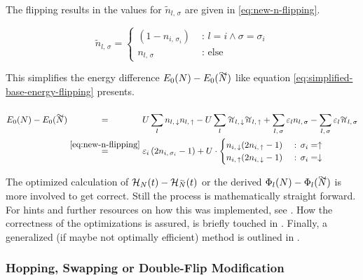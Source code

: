 The flipping results in the values for $\tilde{n}_{l,\,\sigma}$ are given in \autoref{eq:new-n-flipping}.

\begin{equation}
    \label{eq:new-n-flipping}
    \tilde{n}_{l,\,\sigma} = \begin{cases}
        (1 - n_{i,\,\sigma_i})&\text{ : } l = i \land \sigma = \sigma_i   \\
        n_{l,\,\sigma} &\text{ : else}
    \end{cases}
\end{equation}

This simplifies the energy difference $E_0(N)-E_0(\vphantom{N}\smash{\tilde{N}})$ like equation \autoref{eq:simplified-base-energy-flipping} presents.

\begin{equation}
    \label{eq:simplified-base-energy-flipping}
    \begin{split}
        E_0(N)-E_0(\vphantom{N}\smash{\tilde{N}}) 
        &\stackrel{\phantom{\ref{eq:new-n-flipping}}}{=} U\lsum n_{l,\,\down}n_{l,\,\up}-U\lsum \tilde{n}_{l,\,\down}\tilde{n}_{l,\,\up} 
        + \lsum[l,\,\sigma] \epsl n_{l,\,\sigma} - \lsum[l,\,\sigma] \epsl \tilde{n}_{l,\,\sigma}\\
        &\stackrel{\ref{eq:new-n-flipping}}{=} \epsl[i] \left(2 n_{i,\,\sigma_i} - 1\right) +
        U\cdot \begin{cases}
            n_{i,\,\down} (2 n_{i,\,\up} - 1) &\text{ : } \sigma_i = \up   \\
            n_{i,\,\up} (2 n_{i,\,\down} - 1) &\text{ : } \sigma_i = \down 
        \end{cases}
    \end{split}
\end{equation}

The optimized calculation of $\HNOft - \HNOft[\vphantom{N}\smash{\tilde{N}}]$ or the derived $\Phi_l(N) - \Phi_l(\vphantom{N}\smash{\tilde{N}})$ is more involved to get correct.
Still the process is mathematically straight forward. 
For hints and further resources on how this was implemented, see .
How the correctness of the optimizations is assured, is briefly touched in .
Finally, a generalized (if maybe not optimally efficient) method is outlined in .

\subsubsection*{Hopping, Swapping or Double-Flip Modification}

